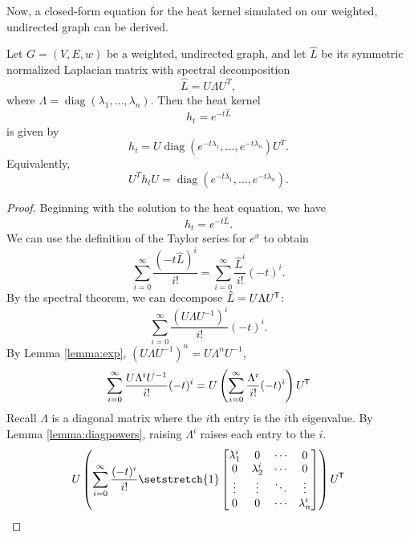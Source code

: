 Now, a closed-form equation for the heat kernel simulated on our weighted, undirected graph can be derived.

\begin{proposition}
Let \(G=(V,E,w)\) be a weighted, undirected graph, and let \(\hat{L}\) be its symmetric normalized Laplacian matrix with spectral decomposition
\[
\hat{L}=U\Lambda U^T,
\]
where \(\Lambda=\operatorname{diag}(\lambda_1,\dots,\lambda_n)\).
Then the heat kernel
\[
h_t=e^{-t\hat{L}}
\]
is given by
\[
h_t
=
U\operatorname{diag}(e^{-t\lambda_1},\dots,e^{-t\lambda_n})U^T.
\]
Equivalently,
\[
U^T h_t U
=
\operatorname{diag}(e^{-t\lambda_1},\dots,e^{-t\lambda_n}).
\]
\end{proposition}

\begin{proof}
Beginning with the solution to the heat equation, we have
\begin{equation*}
	h_t = e^{-t\hat{L}}.
\end{equation*}
We can use the definition of the Taylor series for \(e^{x}\) to obtain
\begin{equation*}
	\sum_{i=0}^{\infty} \frac{(-t\hat{L})^{i}}{i!} = \sum_{i=0}^{\infty} \frac{\hat{L}^{i}}{i!}(-t)^{i}.
\end{equation*}
By the spectral theorem, we can decompose \(\hat{L} = U\Lambda U^{\mkern-1.5mu\mathsf{T}}\):
\begin{equation*}
	\sum_{i=0}^{\infty} \frac{(U\Lambda U^{-1})^{i}}{i!}(-t)^{i}.
\end{equation*}
By Lemma \ref{lemma:exp}, \((U\Lambda U^{-1})^{n} = U\Lambda^{n} U^{-1}\),
\begin{equation*}
	\sum_{i=0}^{\infty} \frac{U\Lambda^{i} U^{-1}}{i!}(-t)^{i} = U\left(\sum_{i=0}^{\infty}\frac{\Lambda^{i}}{i!}(-t)^{i}\right)U^{\mkern-1.5mu\mathsf{T}}
\end{equation*}
Recall \(\Lambda\) is a diagonal matrix where the \(i\)th entry is the \(i\)th eigenvalue. By Lemma \ref{lemma:diagpowers}, raising \(\Lambda^{i}\) raises each entry to the \(i\).
\begin{equation*}
	U\left(\sum_{i=0}^{\infty}\frac{(-t)^{i}}{i!}{\setstretch{1}\begin{bmatrix}
\lambda_{1}^{i} & 0 & \cdots & 0\\
0 & \lambda_{2}^{i} & \cdots & 0\\
\vdots & \vdots & \ddots & \vdots\\
0 & 0 & \cdots & \lambda_{n}^{i}
\end{bmatrix}}\right)U\tran
\end{equation*}

\end{proof}
